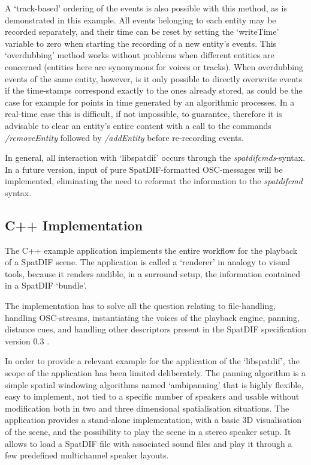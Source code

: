 \documentclass{article}
\begin{document}
A `track-based' ordering of the events is also possible with this method, as is demonstrated in this example.
All events belonging to each entity may be recorded separately, and their time can be reset by setting the `writeTime' variable to zero when starting the recording of a new entity's events.
This `overdubbing' method works without problems when different entities are concerned (entities here are synonymous for voices or tracks).
When overdubbing events of the same entity, however, is it only possible to directly overwrite events if the time-stamps correspond exactly to the ones already stored, as could be the case for example for points in time generated by an algorithmic processes. 
In a real-time case this is difficult, if not impossible, to guarantee, therefore it is advisable to clear an entity's entire content with a call to the commands \emph{/removeEntity} followed by \emph{/addEntity} before re-recording events.

In general, all interaction with `libspatdif' occurs through the \emph{spatdifcmds}-syntax.
In a future version, input of pure SpatDIF-formatted OSC-messages will be implemented, eliminating the need to reformat the information to the \emph{spatdifcmd} syntax.


\subsection{C++ Implementation}\label{subsec:code_application}

The C++ example application implements the entire workflow for the playback of a SpatDIF scene. 
The application is called a `renderer' in analogy to visual tools, because it renders audible, in a surround setup, the information contained in a SpatDIF `bundle'.

The implementation has to solve all the question relating to file-handling, handling OSC-streams, instantiating the voices of the playback engine, panning, distance cues, and handling other descriptors present in the SpatDIF specification version 0.3 \cite{SpatDIF_03}.

In order to provide a relevant example for the application of the `libspatdif', the scope of the application has been limited deliberately.
The panning algorithm is a simple spatial windowing algorithms named `ambipanning' \cite{Neukom:2008ambipan} that is highly flexible, easy to implement, not tied to a specific number of speakers and usable without modification both in two and three dimensional spatialisation situations.
The application provides a stand-alone implementation, with a basic 3D visualisation of the scene, and the possibility to play the scene in a stereo speaker setup.
It allows to load a SpatDIF file with associated sound files and play it through a few predefined multichannel speaker layouts.
\end{document}
